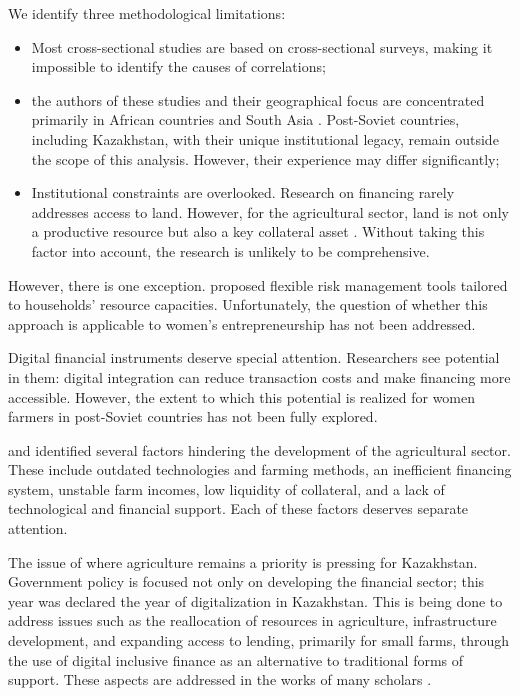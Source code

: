 ﻿\documentclass[pdflatex,sn-mathphys-ay]{sn-jnl}
\begin{document}
We identify three methodological limitations:

\begin{itemize}
\item Most cross-sectional studies are based on cross-sectional
surveys, making it impossible to identify the causes of correlations;
\item the authors of these studies and their geographical focus are
concentrated primarily in African countries and South Asia
\citep{ref90,ref58,ref42,ref71,ref44,ref97,ref84}. Post-Soviet countries, including Kazakhstan, with their
unique institutional legacy, remain outside the scope of this analysis.
However, their experience may differ significantly;
\item Institutional constraints are overlooked. Research on financing
rarely addresses access to land. However, for the agricultural sector,
land is not only a productive resource but also a key collateral asset
\citep{ref20,ref06}. Without taking this factor into
account, the research is unlikely to be comprehensive.
\end{itemize}

However, there is one exception. \citet{ref18} proposed
flexible risk management tools tailored to households' resource
capacities. Unfortunately, the question of whether this approach is
applicable to women's entrepreneurship has not been addressed.

Digital financial instruments deserve special attention. Researchers see
potential in them: digital integration can reduce transaction costs and
make financing more accessible. However, the extent to which this
potential is realized for women farmers in post-Soviet countries has not
been fully explored.

\citet{ref63} and \citet{ref76} identified several factors
hindering the development of the agricultural sector. These include
outdated technologies and farming methods, an inefficient financing
system, unstable farm incomes, low liquidity of collateral, and a lack
of technological and financial support. Each of these factors deserves
separate attention.

The issue of where agriculture remains a priority is pressing for
Kazakhstan. Government policy is focused not only on developing the
financial sector; this year was declared the year of digitalization in
Kazakhstan. This is being done to address issues such as the
reallocation of resources in agriculture, infrastructure development,
and expanding access to lending, primarily for small farms, through the
use of digital inclusive finance as an alternative to traditional forms
of support. These aspects are addressed in the works of many scholars
\citep{ref56,ref80}.
\end{document}

